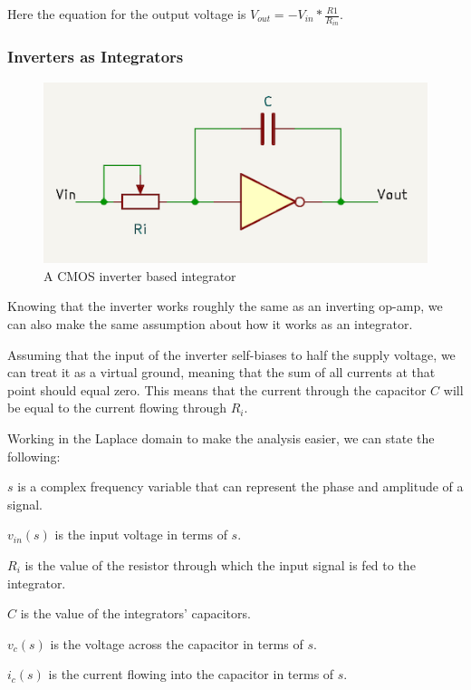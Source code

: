 \documentclass{article}
\begin{document}
Here the equation for the output voltage is $V_{out} = - V_{in} * \frac{R1}{R_{in}}$.

\subsubsection{Inverters as Integrators}

\begin{figure}[h]
  \caption{A CMOS inverter based integrator}
  \includegraphics[width=\linewidth]{images/inverter-integrator.png}
\end{figure}

Knowing that the inverter works roughly the same as an inverting op-amp, we can also make the same assumption about how it works as an integrator.

Assuming that the input of the inverter self-biases to half the supply voltage, we can treat it as a virtual ground, meaning that the sum of all currents at that point should equal zero. This means that the current through the capacitor $C$ will be equal to the current flowing through $R_{i}$.

Working in the Laplace domain to make the analysis easier, we can state the following:

\begin{description}
\item $s$ is a complex frequency variable that can represent the phase and amplitude of a signal.
\item $v_{in}(s)$ is the input voltage in terms of $s$.
\item $R_{i}$ is the value of the resistor through which the input signal is fed to the integrator.
\item $C$ is the value of the integrators' capacitors.
\item $v_c(s)$ is the voltage across the capacitor in terms of $s$.
\item $i_c(s)$ is the current flowing into the capacitor in terms of $s$.
\end{description}
\end{document}
